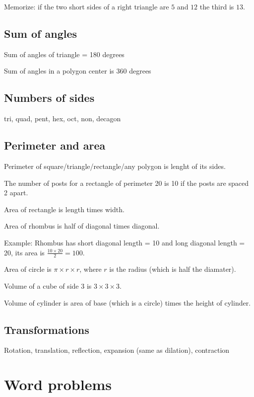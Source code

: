 \documentclass[fullpage,twocolumn]{article}
\begin{document}
Memorize: if the two short sides of a right triangle are $5$ and $12$ the third is
$13$.

\subsection{Sum of angles}
Sum of angles of triangle = 180 degrees 

Sum of angles in a polygon center is 360 degrees

\subsection{Numbers of sides}

tri, quad, pent, hex, oct, non, decagon

\subsection{Perimeter and area}

Perimeter of square/triangle/rectangle/any polygon is lenght of its sides.

The number of posts for a rectangle of perimeter
20 is 10 if the posts are spaced 2 apart.

Area of rectangle is length times width.

Area of rhombus is half of diagonal times diagonal.

Example: Rhombus has short diagonal length = 10 and long diagonal length = 20,
its area is $\frac{10 \times 20}{2} = 100$.

Area of circle is $\pi \times r \times r$, where $r$ is the radius (which is half the diamater).

Volume of a cube of side 3 is $3 \times 3 \times 3$.

Volume of cylinder is area of base (which is a circle) times the
height of cylinder.

\subsection{Transformations}

Rotation, translation, reflection, expansion (same as dilation), contraction


\section{Word problems}
\end{document}

